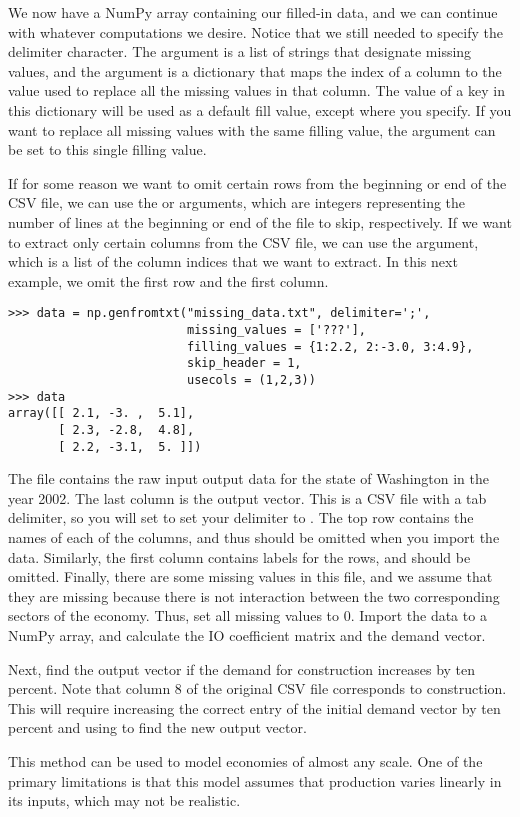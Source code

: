 We now have a NumPy array containing our filled-in data, and we can continue with whatever computations we desire. Notice
that we still needed to specify the delimiter character. The  argument is a list of strings that 
designate missing values, and the  argument is a dictionary that maps the index of a column to the 
value used to replace all the missing values in that column.  The value of a  key in this dictionary will be used as a default fill value, except where you specify.  If you want to replace all missing values with the same
filling value, the  argument can be set to this single filling value.

If for some reason we want to omit certain rows from the beginning or end of the CSV file, we can use the  or 
arguments, which are integers representing the number of lines at the beginning or end of the file to skip, respectively.
If we want to extract only certain columns from the CSV file, we can use the  argument, which is a list of
the column indices that we want to extract. In this next example, we omit the first row and the first column.

\begin{lstlisting}
>>> data = np.genfromtxt("missing_data.txt", delimiter=';',
                         missing_values = ['???'],
                         filling_values = {1:2.2, 2:-3.0, 3:4.9},
                         skip_header = 1,
                         usecols = (1,2,3))
>>> data
array([[ 2.1, -3. ,  5.1],
       [ 2.3, -2.8,  4.8],
       [ 2.2, -3.1,  5. ]])

\end{lstlisting}

\begin{problem}
The file  contains the raw input output data for the state of Washington in the year 2002.
The last column is the output vector. This is a CSV file with a tab delimiter, so you will set to set your 
delimiter to . The top row contains the names of each of the columns, and thus should be omitted when
you import the data. Similarly, the first column contains labels for the rows, and should be omitted. Finally,
there are some missing values in this file, and we assume that they are missing because there is not interaction
between the two corresponding sectors of the economy. Thus, set all missing values to 0. Import the data
to a NumPy array, and calculate the IO coefficient matrix and the demand vector.

Next, find the output vector if the demand for construction increases by ten percent.
Note that column 8 of the original CSV file corresponds to construction.
This will require increasing the correct entry of the initial 
demand vector by ten percent and using  to find the new output vector.
\end{problem}

This method can be used to model economies of almost any scale.
One of the primary limitations is that this model assumes that production varies linearly in its inputs, which may not be realistic.
